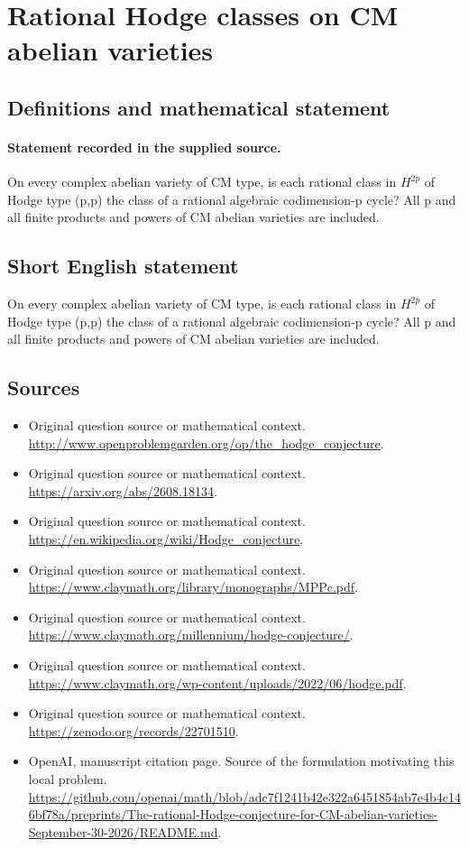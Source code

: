 \documentclass[11pt]{article}
\begin{document}
\section*{Rational Hodge classes on CM abelian varieties}\label{30007032}
\subsection{Definitions and mathematical statement}
\paragraph{Statement recorded in the supplied source.}
On every complex abelian variety of CM type, is each rational class in $H^{2p}$ of Hodge type (p,p) the class of a rational algebraic codimension-p cycle? All p and all finite products and powers of CM abelian varieties are included.
\subsection{Short English statement}
On every complex abelian variety of CM type, is each rational class in $H^{2p}$ of Hodge type (p,p) the class of a rational algebraic codimension-p cycle? All p and all finite products and powers of CM abelian varieties are included.
\subsection{Sources}
\begin{itemize}
\item[S1] Original question source or mathematical context.
\url{http://www.openproblemgarden.org/op/the_hodge_conjecture}.
\item[S2] Original question source or mathematical context.
\url{https://arxiv.org/abs/2608.18134}.
\item[S3] Original question source or mathematical context.
\url{https://en.wikipedia.org/wiki/Hodge_conjecture}.
\item[S4] Original question source or mathematical context.
\url{https://www.claymath.org/library/monographs/MPPc.pdf}.
\item[S5] Original question source or mathematical context.
\url{https://www.claymath.org/millennium/hodge-conjecture/}.
\item[S6] Original question source or mathematical context.
\url{https://www.claymath.org/wp-content/uploads/2022/06/hodge.pdf}.
\item[S7] Original question source or mathematical context.
\url{https://zenodo.org/records/22701510}.
\item[S8] OpenAI, manuscript citation page. Source of the formulation motivating this local problem.
\url{https://github.com/openai/math/blob/adc7f1241b42e322a6451854ab7e4b4c146bf78a/preprints/The-rational-Hodge-conjecture-for-CM-abelian-varieties-September-30-2026/README.md}.
\end{itemize}
\end{document}
